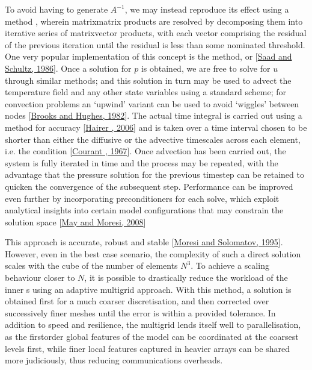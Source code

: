 \documentclass[letterpaper,10pt,english]{jupyterBook}
\begin{document}
\sphinxAtStartPar
To avoid having to generate \(A^{-1}\), we may instead reproduce its effect using a  method , wherein matrix\sphinxhyphen{}matrix products are resolved by decomposing them into iterative series of matrix\sphinxhyphen{}vector products, with each vector comprising the residual of the previous iteration until the residual is less than some nominated threshold. One very popular implementation of this concept is the  method, or  {[}\hyperlink{cite.references:id685}{Saad and Schultz, 1986}{]}. Once a solution for \(p\) is obtained, we are free to solve for \(u\) through similar methods; and this solution in turn may be used to advect the temperature field and any other state variables using a standard  scheme; for convection problems an ‘upwind’ variant can be used to avoid ‘wiggles’ between nodes {[}\hyperlink{cite.references:id924}{Brooks and Hughes, 1982}{]}. The actual time integral is carried out using a  method for accuracy {[}\hyperlink{cite.references:id687}{Hairer , 2006}{]} and is taken over a time interval chosen to be shorter than either the diffusive or the advective timescales across each element, i.e. the  condition {[}\hyperlink{cite.references:id684}{Courant , 1967}{]}. Once advection has been carried out, the system is fully iterated in time and the process may be repeated, with the advantage that the pressure solution for the previous timestep can be retained to quicken the convergence of the subsequent step. Performance can be improved even further by incorporating preconditioners for each solve, which exploit  analytical insights into certain model configurations that may constrain the solution space {[}\hyperlink{cite.references:id671}{May and Moresi, 2008}{]}

\sphinxAtStartPar
This approach is accurate, robust and stable {[}\hyperlink{cite.references:id384}{Moresi and Solomatov, 1995}{]}. However, even in the best case scenario, the complexity of such a direct solution scales with the cube of the number of elements \(N^3\). To achieve a scaling behaviour closer to \(N\), it is possible to drastically reduce the workload of the inner s using an adaptive multi\sphinxhyphen{}grid approach. With this method, a solution is obtained first for a much coarser discretisation, and then corrected over successively finer meshes until the error is within a provided tolerance. In addition to speed and resilience, the multi\sphinxhyphen{}grid lends itself well to parallelisation, as the first\sphinxhyphen{}order global features of the model can be coordinated at the coarsest levels first, while finer local features captured in heavier arrays can be shared more judiciously, thus reducing communications overheads.
\end{document}
